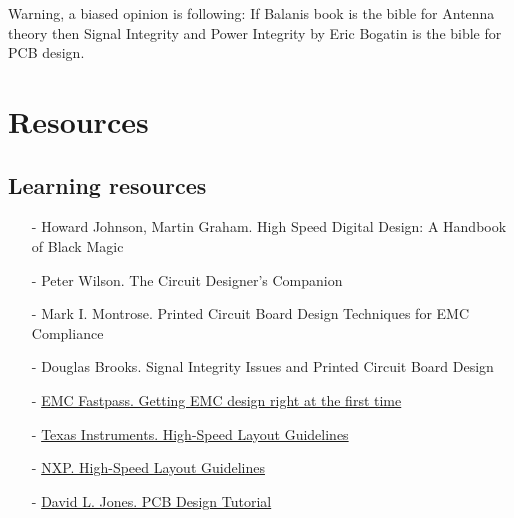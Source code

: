 \documentclass[final]{cubedoc}
\begin{document}
	Warning, a biased opinion is following: If Balanis book is the bible for Antenna theory then Signal Integrity and Power Integrity by Eric Bogatin is the bible for PCB design.
	
	
	
	\section{Resources}
	\subsection{Learning resources}
	\begin{itemize}
		\item[-] Howard Johnson, Martin Graham. High Speed Digital Design: A Handbook of Black Magic 
		\item[-] Peter Wilson. The Circuit Designer's Companion
		\item[-] Mark I. Montrose. Printed Circuit Board Design Techniques for EMC Compliance 
		\item[-] Douglas Brooks. Signal Integrity Issues and Printed Circuit Board Design
		\item[-] \href{https://drive.google.com/file/d/1C4cFAzJpTlKedcgKvlWDQnTaCCgdo58s/view?usp=sharing}{EMC Fastpass. Getting EMC design right at the first time}
		\item[-] \href{https://drive.google.com/file/d/1mr8UNMDeXmdCBnOVq22b1YUi3WwKNUMm/view?usp=sharing}{Texas Instruments. High-Speed Layout Guidelines}
		\item[-] \href{    https://drive.google.com/file/d/1gwrVG8WULKCOxYYrVLvCCZh1-luvQacq/view?usp=sharing}{NXP. High-Speed Layout Guidelines}
		\item[-] \href{https://drive.google.com/file/d/1ylptbGbczsr2scbjPCba7q4J1PiyvQL8/view?usp=sharing}{David L. Jones. PCB Design Tutorial}
		
	\end{itemize}
	
\end{document}
